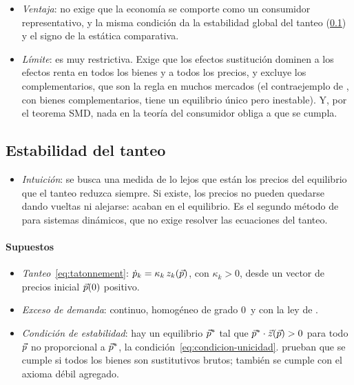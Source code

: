 \documentclass[11pt]{article}
\begin{document}
\begin{itemize}
\item \emph{Ventaja}: no exige que la economía se comporte como un consumidor representativo, y la misma condición da la estabilidad global del tanteo (\ref{anexo:estabilidad}) y el signo de la estática comparativa\nocite{MasColellWhinstonGreen1995}.
\item \emph{Límite}: es muy restrictiva. Exige que los efectos sustitución dominen a los efectos renta en todos los bienes y a todos los precios, y excluye los complementarios, que son la regla en muchos mercados (el contraejemplo de , con bienes complementarios, tiene un equilibrio único pero inestable). Y, por el teorema SMD, nada en la teoría del consumidor obliga a que se cumpla.
\end{itemize}

\subsection{Estabilidad del tanteo}\label{anexo:estabilidad}

\begin{itemize}
\item \emph{Intuición}: se busca una medida de lo lejos que están los precios del equilibrio que el tanteo reduzca siempre. Si existe, los precios no pueden quedarse dando vueltas ni alejarse: acaban en el equilibrio. Es el segundo método de  para sistemas dinámicos, que no exige resolver las ecuaciones del tanteo.
\end{itemize}

\paragraph{Supuestos}

\begin{itemize}
\item \emph{Tanteo}~\eqref{eq:tatonnement}: $\dot p_k=\kappa_k\,z_k(\vec{p})$, con $\kappa_k>0$, desde un vector de precios inicial $\vec{p}(0)$ positivo.
\item \emph{Exceso de demanda}: continuo, homogéneo de grado 0~y con la ley de .
\item \emph{Condición de estabilidad}: hay un equilibrio $\vec{p}^*$ tal que $\vec{p}^*\cdot\vec{z}(\vec{p})>0$ para todo $\vec{p}$ no proporcional a $\vec{p}^*$, la condición~\eqref{eq:condicion-unicidad}. \textcite{ArrowBlockHurwicz1959Stability} prueban que se cumple si todos los bienes son sustitutivos brutos; también se cumple con el axioma débil agregado\nocite{MasColellWhinstonGreen1995}.
\end{itemize}
\end{document}
